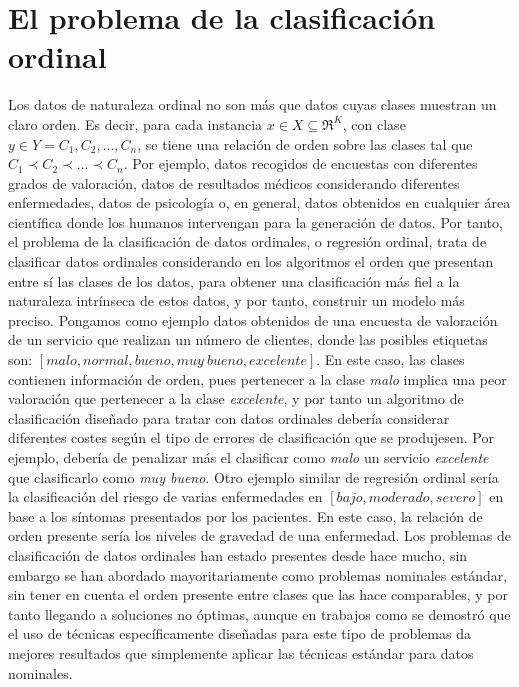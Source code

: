 \section{El problema de la clasificación ordinal}
Los datos de naturaleza ordinal no son más que datos cuyas clases muestran un claro orden. Es decir, para cada instancia $x \in X \subseteq \Re^K $, con clase $y\in Y={C_1,C_2,...,C_n}$, se tiene una relación de orden sobre las clases tal que $C_1 \prec C_2 \prec ... \prec C_n$. Por ejemplo, datos recogidos de encuestas con diferentes grados de valoración, datos de resultados médicos considerando diferentes enfermedades, datos de psicología o, en general, datos obtenidos en cualquier área científica donde los humanos intervengan para la generación de datos. \newline
Por tanto, el problema de la clasificación de datos ordinales, o regresión ordinal, trata de clasificar datos ordinales considerando en los algoritmos el orden que presentan entre sí las clases de los datos, para obtener una clasificación más fiel a la naturaleza intrínseca de estos datos, y por tanto, construir un modelo más preciso. Pongamos como ejemplo datos obtenidos de una encuesta de valoración de un servicio que realizan un número de clientes, donde las posibles etiquetas son: \textit{$\left[malo, normal, bueno, muy\ bueno, excelente\right]$}. En este caso, las clases contienen información de orden, pues pertenecer a la clase \textit{malo} implica una peor valoración que pertenecer a la clase \textit{excelente}, y por tanto un algoritmo de clasificación diseñado para tratar con datos ordinales debería considerar diferentes costes según el tipo de errores de clasificación que se produjesen. Por ejemplo, debería de penalizar más el clasificar como \textit{malo} un servicio \textit{excelente} que clasificarlo como \textit{muy bueno}. Otro ejemplo similar de regresión ordinal sería la clasificación del riesgo de varias enfermedades en \textit{$\left[bajo, moderado, severo\right]$} en base a los síntomas presentados por los pacientes. En este caso, la relación de orden presente sería los niveles de gravedad de una enfermedad. \newline
Los problemas de clasificación de datos ordinales han estado presentes desde hace mucho, sin embargo se han abordado mayoritariamente como problemas nominales estándar, sin tener en cuenta el orden presente entre clases que las hace comparables, y por tanto llegando a soluciones no óptimas, aunque en trabajos como \cite{Gutiérrez2016} se demostró que el uso de técnicas específicamente diseñadas para este tipo de problemas da mejores resultados que simplemente aplicar las técnicas estándar para datos nominales. 

